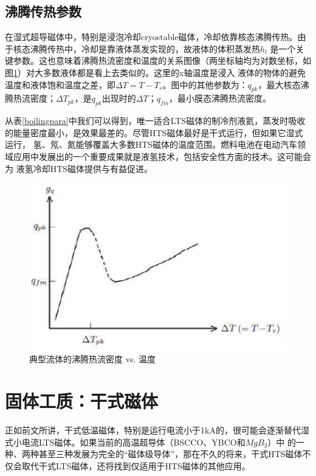 \subsection*{沸腾传热参数}
在湿式超导磁体中，特别是浸泡冷却cryostable磁体，冷却依靠核态沸腾传热。由于核态沸腾传热中，冷却是靠液体蒸发实现的，故液体的体积蒸发热$h_l$
是一个关键参数。这也意味着沸腾热流密度和温度的关系图像（两坐标轴均为对数坐标，如图\ref{boilingflux}）对大多数液体都是看上去类似的。这里的x轴温度是浸入
液体的物体的避免温度和液体饱和温度之差，即$\Delta T=T-T_s$。图中的其他参数为：$q_{pk}$，最大核态沸腾热流密度；$\Delta T_{pk}$，是$q_{pk}$出现时的$\Delta T$；$q_{fm}$，最小膜态沸腾热流密度。

从表\ref{boilingpara}中我们可以得到，唯一适合LTS磁体的制冷剂液氦，蒸发时吸收的能量密度最小，是效果最差的。尽管HTS磁体最好是干式运行，但如果它湿式运行，
氢、氖、氮能够覆盖大多数HTS磁体的温度范围。燃料电池在电动汽车领域应用中发展出的一个重要成果就是液氢技术，包括安全性方面的技术。这可能会为
液氢冷却HTS磁体提供与有益促进。

\begin{figure}
  \centering
 \includegraphics[scale=0.8]{chpt4/figs/fig4.1.eps}
  \caption{典型流体的沸腾热流密度 vs. 温度}\label{boilingflux}
\end{figure}

\section{固体工质：干式磁体}
正如前文所讲，干式低温磁体，特别是运行电流小于1kA的，很可能会逐渐替代湿式小电流LTS磁体。如果当前的高温超导体（BSCCO、YBCO和$MgB_2$）中
的一种、两种甚至三种发展为完全的“磁体级导体”，那在不久的将来，干式HTS磁体不仅会取代干式LTS磁体，还将找到仅适用于HTS磁体的其他应用。
